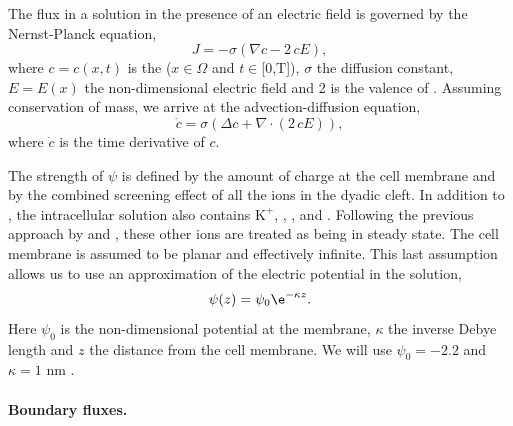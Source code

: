 The \Ca flux in a solution in the presence of an electric field is
governed by the Nernst-Planck equation,
\begin{equation}
  \label{eq:hake:nernst-planck}
  J = -\sigma\left(\nabla c-2\,cE\right),
\end{equation}
where $c = c(x,t)$ is the \CaC ($x\in\Omega$ and $t\in$[0,T]),
$\sigma$ the diffusion constant, $E = E(x)$ the non-dimensional
electric field and 2 is the valence of \Ca. Assuming conservation of
mass, we arrive at the advection-diffusion equation,
\begin{equation}
  \label{eq:hake:advection-diffusion}
  \dot{c}=\sigma\left(\Delta c + \nabla\cdot\left(2\,cE\right)\right),
\end{equation}
where $\dot{c}$ is the time derivative of $c$.

The strength of $\psi$ is defined by the amount of charge at the cell
membrane and by the combined screening effect of all the ions in the
dyadic cleft. In addition to \Ca, the intracellular solution also
contains \ensuremath{\mbox{K}^{+}}, \Na, \Cl, and \Mg. Following the
previous approach by \citet{LangnerCafisoMarceljaEtAl1990} and
\citet{SoellerCannell1997}, these other ions are treated as being in
steady state. The cell membrane is assumed to be planar and
effectively infinite. This last assumption allows us to use an
approximation of the electric potential in the solution,
\begin{equation}
  \label{eq:hake:electric_potential}
  \psi(z) = \psi_0\e^{-\kappa{}z}.
\end{equation}
Here $\psi_0$ is the non-dimensional potential at the membrane,
$\kappa$ the inverse Debye length and $z$ the distance from the cell
membrane. We will use $\psi_0=-2.2$ and $\kappa=1$ nm
\citep{SoellerCannell1997}.

\paragraph{Boundary fluxes.}

